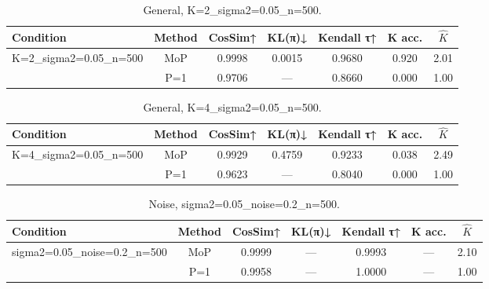 \begin{table}[ht]
  \centering
  \caption{General, K=2_sigma2=0.05_n=500.}
  \label{tab:sim_general_K2_sigma20_05_n500}
  \begin{tabular}{lcccccc}
    \toprule
    Condition & Method & CosSim↑ & KL(π)↓ & Kendall τ↑ & K acc. & $\hat{K}$ \\
    \midrule
    K=2_sigma2=0.05_n=500 & MoP & 0.9998 & 0.0015 & 0.9680 & 0.920 & 2.01 \\
     & P=1 & 0.9706 & --- & 0.8660 & 0.000 & 1.00 \\
    \bottomrule
  \end{tabular}
\end{table}

\begin{table}[ht]
  \centering
  \caption{General, K=4_sigma2=0.05_n=500.}
  \label{tab:sim_general_K4_sigma20_05_n500}
  \begin{tabular}{lcccccc}
    \toprule
    Condition & Method & CosSim↑ & KL(π)↓ & Kendall τ↑ & K acc. & $\hat{K}$ \\
    \midrule
    K=4_sigma2=0.05_n=500 & MoP & 0.9929 & 0.4759 & 0.9233 & 0.038 & 2.49 \\
     & P=1 & 0.9623 & --- & 0.8040 & 0.000 & 1.00 \\
    \bottomrule
  \end{tabular}
\end{table}

\begin{table}[ht]
  \centering
  \caption{Noise, sigma2=0.05_noise=0.2_n=500.}
  \label{tab:sim_noise_sigma20_05_noise0_2_n500}
  \begin{tabular}{lcccccc}
    \toprule
    Condition & Method & CosSim↑ & KL(π)↓ & Kendall τ↑ & K acc. & $\hat{K}$ \\
    \midrule
    sigma2=0.05_noise=0.2_n=500 & MoP & 0.9999 & --- & 0.9993 & --- & 2.10 \\
     & P=1 & 0.9958 & --- & 1.0000 & --- & 1.00 \\
    \bottomrule
  \end{tabular}
\end{table}
